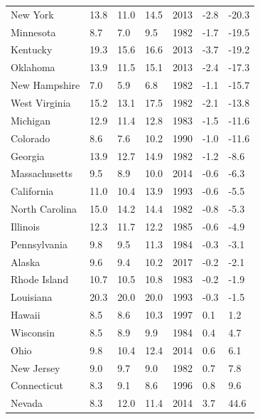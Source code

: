 \begin{longtable}{llllrll}
New York & 13.8 & 11.0 & 14.5 & 2013 & -2.8 & -20.3 \\
Minnesota & 8.7 & 7.0 & 9.5 & 1982 & -1.7 & -19.5 \\
Kentucky & 19.3 & 15.6 & 16.6 & 2013 & -3.7 & -19.2 \\
Oklahoma & 13.9 & 11.5 & 15.1 & 2013 & -2.4 & -17.3 \\
New Hampshire & 7.0 & 5.9 & 6.8 & 1982 & -1.1 & -15.7 \\
West Virginia & 15.2 & 13.1 & 17.5 & 1982 & -2.1 & -13.8 \\
Michigan & 12.9 & 11.4 & 12.8 & 1983 & -1.5 & -11.6 \\
Colorado & 8.6 & 7.6 & 10.2 & 1990 & -1.0 & -11.6 \\
Georgia & 13.9 & 12.7 & 14.9 & 1982 & -1.2 & -8.6 \\
Massachusetts & 9.5 & 8.9 & 10.0 & 2014 & -0.6 & -6.3 \\
California & 11.0 & 10.4 & 13.9 & 1993 & -0.6 & -5.5 \\
North Carolina & 15.0 & 14.2 & 14.4 & 1982 & -0.8 & -5.3 \\
Illinois & 12.3 & 11.7 & 12.2 & 1985 & -0.6 & -4.9 \\
Pennsylvania & 9.8 & 9.5 & 11.3 & 1984 & -0.3 & -3.1 \\
Alaska & 9.6 & 9.4 & 10.2 & 2017 & -0.2 & -2.1 \\
Rhode Island & 10.7 & 10.5 & 10.8 & 1983 & -0.2 & -1.9 \\
Louisiana & 20.3 & 20.0 & 20.0 & 1993 & -0.3 & -1.5 \\
Hawaii & 8.5 & 8.6 & 10.3 & 1997 & 0.1 & 1.2 \\
Wisconsin & 8.5 & 8.9 & 9.9 & 1984 & 0.4 & 4.7 \\
Ohio & 9.8 & 10.4 & 12.4 & 2014 & 0.6 & 6.1 \\
New Jersey & 9.0 & 9.7 & 9.0 & 1982 & 0.7 & 7.8 \\
Connecticut & 8.3 & 9.1 & 8.6 & 1996 & 0.8 & 9.6 \\
Nevada & 8.3 & 12.0 & 11.4 & 2014 & 3.7 & 44.6 \\

\end{longtable}

